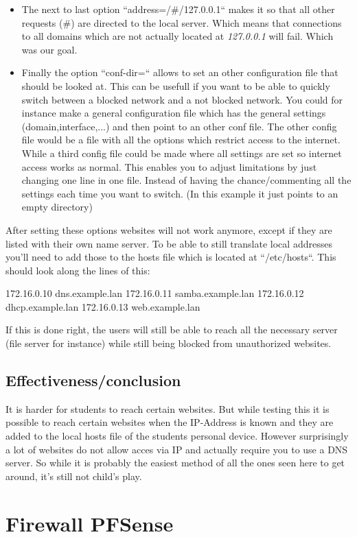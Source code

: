 \begin{itemize}
\item The next to last option ``address=/\#/127.0.0.1`` makes it so that all other requests (\#) are directed to the local server. Which means that connections to all domains which are not actually located at \textit{127.0.0.1} will fail. Which was our goal.
\item Finally the option ``conf-dir=`` allows to set an other configuration file that should be looked at. This can be usefull if you want to be able to quickly switch between a blocked network and a not blocked network. You could for instance make a general configuration file which has the general settings (domain,interface,...) and then point to an other conf file. The other config file would be a file with all the options which restrict access to the internet. While a third config file could be made where all settings are set so internet access works as normal. This enables you to adjust limitations by just changing one line in one file. Instead of having the chance/commenting all the settings each time you want to switch. (In this example it just points to an empty directory)
\end{itemize}
After setting these options websites will not work anymore, except if they are listed with their own name server. To be able to still translate local addresses you'll need to add those to the hosts file which is located at ``/etc/hosts``. This should look along the lines of this:
\begin{cisco}[title=/etc/hosts file]
172.16.0.10 dns.example.lan
172.16.0.11 samba.example.lan
172.16.0.12 dhcp.example.lan
172.16.0.13 web.example.lan
\end{cisco}
If this is done right, the users will still be able to reach all the necessary server (file server for instance) while still being blocked from unauthorized websites.
\subsection{Effectiveness/conclusion}
It is harder for students to reach certain websites. But while testing this it is possible to reach certain websites when the IP-Address is known and they are added to the local hosts file of the students personal device. However surprisingly a lot of websites do not allow acces via IP and actually require you to use a DNS server. So while it is probably the easiest method of all the ones seen here to get around, it's still not child's play.
\section{Firewall PFSense}

